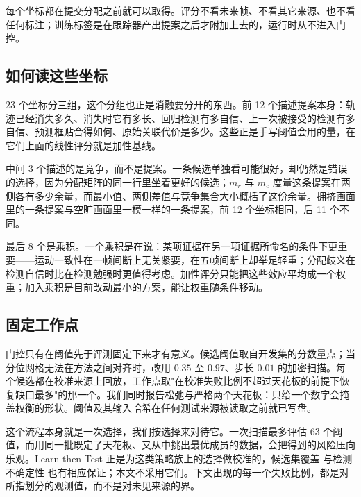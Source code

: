 每个坐标都在提交分配之前就可以取得。评分不看未来帧、不看其它来源、也不看任何标注；训练标签是在跟踪器产出提案之后才附加上去的，运行时从不进入门控。



\subsection{如何读这些坐标}

23 个坐标分三组，这个分组也正是消融要分开的东西。前 12 个描述提案本身：轨迹已经消失多久、消失时它有多长、回归检测有多自信、上一次被接受的检测有多自信、预测框贴合得如何、原始关联代价是多少。这些正是手写阈值会用的量，在它们上面的线性评分就是加性基线。

中间 3 个描述的是竞争，而不是提案。一条候选单独看可能很好，却仍然是错误的选择，因为分配矩阵的同一行里坐着更好的候选；$m_r$ 与 $m_c$ 度量这条提案在两侧各有多少余量，而最小值、两侧差值与竞争集合大小概括了这份余量。拥挤画面里的一条提案与空旷画面里一模一样的一条提案，前 12 个坐标相同，后 11 个不同。

最后 8 个是乘积。一个乘积是在说：某项证据在另一项证据所命名的条件下更重要——运动一致性在一帧间断上无关紧要，在五帧间断上却举足轻重；分配歧义在检测自信时比在检测勉强时更值得考虑。加性评分只能把这些效应平均成一个权重；加入乘积是目前改动最小的方案，能让权重随条件移动。

\subsection{固定工作点}

门控只有在阈值先于评测固定下来才有意义。候选阈值取自开发集的分数量点；当分位网格无法在方法之间对齐时，改用 $0.35$ 至 $0.97$、步长 $0.01$ 的加密扫描。每个候选都在校准来源上回放，工作点取"在校准失败比例不超过天花板的前提下恢复缺口最多"的那一个。我们同时报告松弛与严格两个天花板：只给一个数字会掩盖权衡的形状。阈值及其输入哈希在任何测试来源被读取之前就已写盘。

这个流程本身就是一次选择，我们按选择来对待它。一次扫描最多评估 63 个阈值，而用同一批既定了天花板、又从中挑出最优成员的数据，会把得到的风险压向乐观。Learn-then-Test \cite{angelopoulos2021learn} 正是为这类策略族上的选择做校准的，候选集覆盖 \cite{li2022pac} 与检测不确定性 \cite{su2024motcup} 也有相应保证；本文不采用它们。下文出现的每一个失败比例，都是对所指划分的观测值，而不是对未见来源的界。
